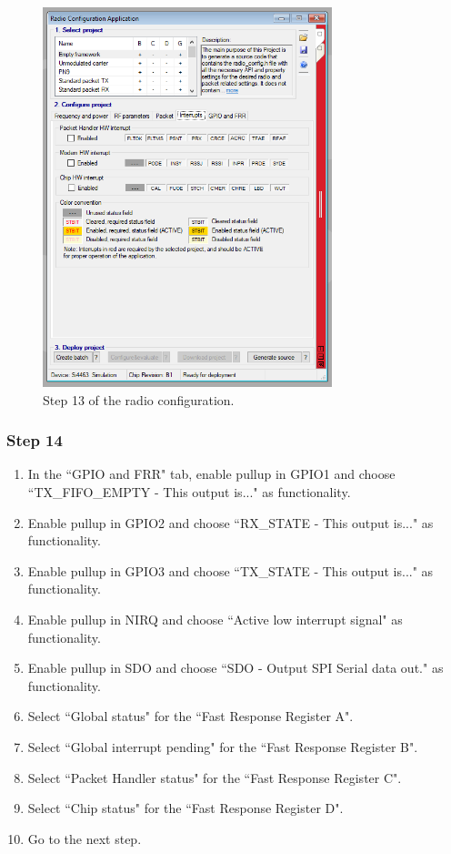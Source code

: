 \begin{figure}[!h]
	\begin{center}
		\includegraphics[width=0.75\textwidth]{figures/wds-tutorial/wds-tutorial-13.png}
		\caption{Step 13 of the radio configuration.}
		\label{fig:wds-tutorial-step-13}
	\end{center}
\end{figure}

\subsubsection{Step 14}

\begin{enumerate}
    \item In the ``GPIO and FRR" tab, enable pullup in GPIO1 and choose ``TX\_FIFO\_EMPTY - This output is..." as functionality.
    \item Enable pullup in GPIO2 and choose ``RX\_STATE - This output is..." as functionality.
    \item Enable pullup in GPIO3 and choose ``TX\_STATE - This output is..." as functionality.
    \item Enable pullup in NIRQ and choose ``Active low interrupt signal" as functionality.
    \item Enable pullup in SDO and choose ``SDO - Output SPI Serial data out." as functionality.
    \item Select ``Global status" for the ``Fast Response Register A".
    \item Select ``Global interrupt pending" for the ``Fast Response Register B".
    \item Select ``Packet Handler status" for the ``Fast Response Register C".
    \item Select ``Chip status" for the ``Fast Response Register D".
    \item Go to the next step.
\end{enumerate}

